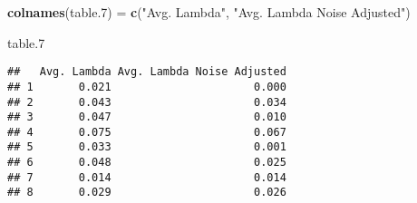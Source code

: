 \documentclass[
]{article}
\newenvironment{Shaded}{\begin{snugshade}}{\end{snugshade}}
\newcommand{\FloatTok}[1]{\textcolor[rgb]{0.00,0.00,0.81}{#1}}
\newcommand{\FunctionTok}[1]{\textcolor[rgb]{0.13,0.29,0.53}{\textbf{#1}}}
\newcommand{\NormalTok}[1]{#1}
\newcommand{\OtherTok}[1]{\textcolor[rgb]{0.56,0.35,0.01}{#1}}
\newcommand{\StringTok}[1]{\textcolor[rgb]{0.31,0.60,0.02}{#1}}
\begin{document}
\begin{Shaded}
\begin{Highlighting}[]
\FunctionTok{colnames}\NormalTok{(table}\FloatTok{.7}\NormalTok{) }\OtherTok{=} \FunctionTok{c}\NormalTok{(}\StringTok{"Avg. Lambda"}\NormalTok{, }\StringTok{"Avg. Lambda Noise Adjusted"}\NormalTok{)}

\NormalTok{table}\FloatTok{.7}
\end{Highlighting}
\end{Shaded}

\begin{verbatim}
##   Avg. Lambda Avg. Lambda Noise Adjusted
## 1       0.021                      0.000
## 2       0.043                      0.034
## 3       0.047                      0.010
## 4       0.075                      0.067
## 5       0.033                      0.001
## 6       0.048                      0.025
## 7       0.014                      0.014
## 8       0.029                      0.026
\end{verbatim}
\end{document}
